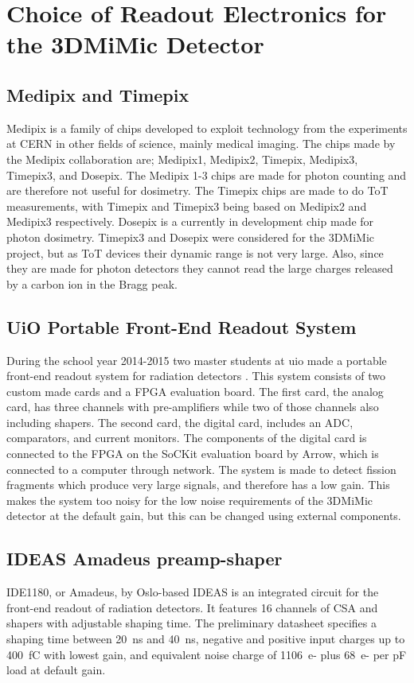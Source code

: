 \documentclass[../main/thesis.tex]{subfiles}
\begin{document}
\newpage

\chapter{Choice of Readout Electronics for the 3DMiMic Detector}
\label{e}

\section{Medipix and Timepix}
\label{e-medipix}
Medipix is a family of chips developed to exploit technology from the experiments at CERN in other fields of science, mainly medical imaging. The chips made by the Medipix collaboration are; Medipix1, Medipix2, Timepix, Medipix3, Timepix3, and Dosepix. The Medipix 1-3 chips are made for photon counting and are therefore not useful for dosimetry. The Timepix chips are made to do \gls{ToT} measurements, with Timepix and Timepix3 being based on Medipix2 and Medipix3 respectively. Dosepix is a currently in development chip made for photon dosimetry. Timepix3 and Dosepix were considered for the 3DMiMic project, but as \gls{ToT} devices their dynamic range is not very large. Also, since they are made for photon detectors they cannot read the large charges released by a carbon ion in the Bragg peak. 

\section{UiO Portable Front-End Readout System}
\label{e-uio}
During the school year 2014-2015 two master students at \gls{uio} made a portable front-end readout system for radiation detectors \citep{tali} \citep{oltedal}. This system consists of two custom made cards and a \gls{FPGA} evaluation board. The first card, the analog card, has three channels with pre-amplifiers while two of those channels also including shapers. The second card, the digital card, includes an \gls{ADC}, comparators, and current monitors. The components of the digital card is connected to the \gls{FPGA} on the SoCKit evaluation board by Arrow, which is connected to a computer through network. The system is made to detect fission fragments which produce very large signals, and therefore has a low gain. This makes the system too noisy for the low noise requirements of the 3DMiMic detector at the default gain, but this can be changed using external components.

\section{IDEAS Amadeus preamp-shaper}
\label{e-ide1180}
IDE1180, or Amadeus, by Oslo-based IDEAS is an integrated circuit for the front-end readout of radiation detectors. It features 16 channels of \gls{CSA} and shapers with adjustable shaping time. The preliminary datasheet \citep{IDE1180} specifies a shaping time between 20~ns and 40~ns, negative and positive input charges up to 400~fC with lowest gain, and equivalent noise charge of 1106~e- plus 68~e- per pF load at default gain. 
\end{document}
